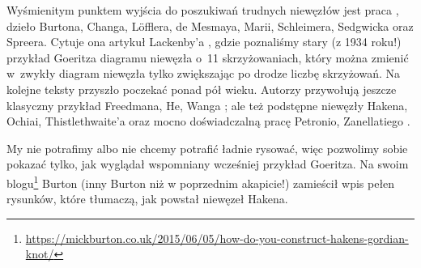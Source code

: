 Wyśmienitym punktem wyjścia do poszukiwań trudnych niewęzłów jest praca \cite{schleimer2021}, dzieło Burtona, Changa, Löfflera, de Mesmaya, Marii, Schleimera, Sedgwicka oraz Spreera.
%
%
%
%
%
%
%
%
Cytuje ona artykuł Lackenby'a \cite{lackenby2015}, gdzie poznaliśmy stary (z 1934 roku!) przykład Goeritza \cite{goeritz1934} diagramu niewęzła o~11 skrzyżowaniach, który można zmienić w~zwykły diagram niewęzła tylko zwiększając po drodze liczbę skrzyżowań.
%
%
Na kolejne teksty przyszło poczekać ponad pół wieku.
Autorzy przywołują jeszcze klasyczny przykład Freedmana, He, Wanga \cite{freedman1994}; ale też podstępne niewęzły Hakena, Ochiai, Thistlethwaite'a oraz mocno doświadczalną pracę Petronio, Zanellatiego \cite{zanellati2016}.
%
%
%
%
%
%


My nie potrafimy albo nie chcemy potrafić ładnie rysować, więc pozwolimy sobie pokazać tylko, jak wyglądał wspomniany wcześniej przykład Goeritza.
Na swoim blogu\footnote{\url{https://mickburton.co.uk/2015/06/05/how-do-you-construct-hakens-gordian-knot/}} Burton (inny Burton niż w poprzednim akapicie!) zamieścił wpis pełen rysunków, które tłumaczą, jak powstał niewęzeł Hakena.

